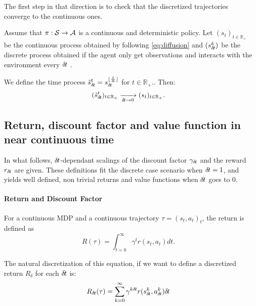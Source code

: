        The first step in that direction is to check that the discretized
          trajectories converge to the continuous ones. 
	\begin{theorem}
		Assume that $\pi: {\cal S} \rightarrow {\cal A}$ is a continuous and
		deterministic policy. Let $(s_t)_{t\in\mathbb{R}_+}$ be the
		continuous process obtained by following \eqref{eq:diffusion} and
		$(s_{\delta\hspace{-.1em}t}^k)$ be the discrete process obtained if the agent only
		get observations and interacts with the environment every ${\delta\hspace{-.1em}t}$ .

		We define the time process $\tilde s_{\delta\hspace{-.1em}t}^t = s^{\lfloor
		\frac{t}{{\delta\hspace{-.1em}t}}\rfloor}_{\delta\hspace{-.1em}t}$ for
		$t\in\mathbb{R_+}$.. Then:
		\begin{equation}
			\label{eq:conv-traj}
			(\tilde s_{\delta\hspace{-.1em}t}^t)_{t\in\mathbb{R}_+} 
			\xrightarrow[{\delta\hspace{-.1em}t} \rightarrow 0]{} (s_t)_{t\in\mathbb{R}_+}.
		\end{equation}
	\end{theorem}
      

\subsection{Return, discount factor and value function in near continuous time}
\label{sec:ret-gamma-v}



	In what follows, ${\delta\hspace{-.1em}t}$-dependant scalings of the discount factor $\gamma_{\delta\hspace{-.1em}t}$
	and the reward $r_{\delta\hspace{-.1em}t}$ are given. These definitions fit the discrete case
	scenario when ${\delta\hspace{-.1em}t}=1$, and yields well defined, non trivial returns
	and value functions when ${\delta\hspace{-.1em}t}$ goes to $0$.

\paragraph{Return and Discount Factor}
For a continuous MDP and a continuous trajectory $\tau = (s_t, a_t)_t$,
the return is defined as~\cite{cont_rl}
\begin{equation}
	\label{eq:continuous-return}
	R(\tau) = \int_{t=0}^\infty\gamma^tr(s_t, a_t)dt.
\end{equation}

The natural discretization of this equation, if we want to define a discretized
return $R_\delta$ for each ${\delta\hspace{-.1em}t}$ is:
\begin{equation}
	\label{eq:discretized-return}
	R_{\delta\hspace{-.1em}t}(\tau) = \sum_{k=0}^\infty\gamma^{k{\delta\hspace{-.1em}t}}
	r(s_{\delta\hspace{-.1em}t}^k, a_{\delta\hspace{-.1em}t}^k){\delta\hspace{-.1em}t}
\end{equation}

